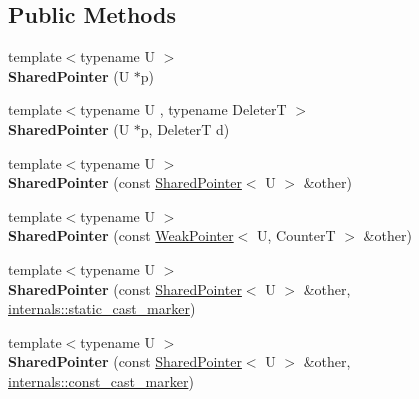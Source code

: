 \subsection*{Public Methods}
\begin{DoxyCompactItemize}
\item 
\mbox{\label{classcugar_1_1_shared_pointer_a8e2fbfd17ca253521d71c00b34264b0a}} 
{\footnotesize template$<$typename U $>$ }\\{\bfseries Shared\+Pointer} (U $\ast$p)
\item 
\mbox{\label{classcugar_1_1_shared_pointer_ac378704338c476ed091acbf1f04b6338}} 
{\footnotesize template$<$typename U , typename DeleterT $>$ }\\{\bfseries Shared\+Pointer} (U $\ast$p, DeleterT d)
\item 
\mbox{\label{classcugar_1_1_shared_pointer_a4865b2c772f97b77ac979c21c18924b8}} 
{\footnotesize template$<$typename U $>$ }\\{\bfseries Shared\+Pointer} (const \hyperlink{classcugar_1_1_shared_pointer}{Shared\+Pointer}$<$ U $>$ \&other)
\item 
\mbox{\label{classcugar_1_1_shared_pointer_ac391fbe7fe830fe0774fa8ae16d5b4a5}} 
{\footnotesize template$<$typename U $>$ }\\{\bfseries Shared\+Pointer} (const \hyperlink{classcugar_1_1_weak_pointer}{Weak\+Pointer}$<$ U, CounterT $>$ \&other)
\item 
\mbox{\label{classcugar_1_1_shared_pointer_a2c60eed962f176862a3e99f313a5aa7a}} 
{\footnotesize template$<$typename U $>$ }\\{\bfseries Shared\+Pointer} (const \hyperlink{classcugar_1_1_shared_pointer}{Shared\+Pointer}$<$ U $>$ \&other, \hyperlink{structcugar_1_1internals_1_1static__cast__marker}{internals\+::static\+\_\+cast\+\_\+marker})
\item 
\mbox{\label{classcugar_1_1_shared_pointer_af0183b3aed5976299907b60249413691}} 
{\footnotesize template$<$typename U $>$ }\\{\bfseries Shared\+Pointer} (const \hyperlink{classcugar_1_1_shared_pointer}{Shared\+Pointer}$<$ U $>$ \&other, \hyperlink{structcugar_1_1internals_1_1const__cast__marker}{internals\+::const\+\_\+cast\+\_\+marker})

\end{DoxyCompactItemize}
